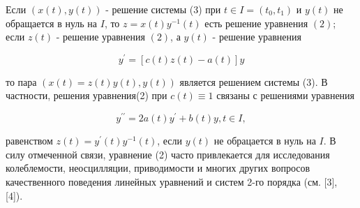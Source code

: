 \documentclass[10pt]{article}
\begin{document}
Если $(x(t), y(t))$ - решение системы (3) при $t \in I=\left(t_{0}, t_{1}\right)$ и $y(t)$ не обращается в нуль на $I$, то $z=x(t) y^{-1}(t)$ есть решение уравнения $(2)$; если $z(t)$ - решение уравнения $(2)$, а $y(t)$ - решение уравнения



\[

y^{\prime}=[c(t) z(t)-a(t)] y

\]



то пара $(x(t)=z(t) y(t), y(t))$ является решением системы (3). В частности, решения уравнения(2) при $c(t) \equiv 1$ связаны с решениями уравнения



\[

y^{\prime \prime}=2 a(t) y^{\prime}+b(t) y, t \in I,

\]



равенством $z(t)=y^{\prime}(t) y^{-1}(t)$, если $y(t)$ не обрацается в нуль на $I$. В силу отмеченной связи, уравнение (2) часто привлекается для исследования колеблемости, неосцилляции, приводимости и многих других вопросов качественного поведения линейных уравнений и систем 2-го порядка (см. [3], [4]).
\end{document}
